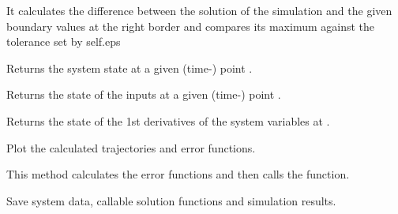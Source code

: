 \documentclass[letterpaper,10pt,english]{sphinxmanual}
\begin{document}
\begin{fulllineitems}
\begin{fulllineitems}
It calculates the difference between the solution of the simulation
and the given boundary values at the right border and compares its
maximum against the tolerance set by self.eps

\end{fulllineitems}


\begin{fulllineitems}
\label{pytrajectory:pytrajectory.trajectory.Trajectory.x}
Returns the system state at a given (time-) point .

\end{fulllineitems}


\begin{fulllineitems}
\label{pytrajectory:pytrajectory.trajectory.Trajectory.u}
Returns the state of the inputs at a given (time-) point .

\end{fulllineitems}


\begin{fulllineitems}
\label{pytrajectory:pytrajectory.trajectory.Trajectory.dx}
Returns the state of the 1st derivatives of the system variables
at .

\end{fulllineitems}


\begin{fulllineitems}
\label{pytrajectory:pytrajectory.trajectory.Trajectory.plot}
Plot the calculated trajectories and error functions.

This method calculates the error functions and then calls
the  function.

\end{fulllineitems}


\begin{fulllineitems}
\label{pytrajectory:pytrajectory.trajectory.Trajectory.save}
Save system data, callable solution functions and simulation results.


\end{fulllineitems}
\end{fulllineitems}
\end{document}
